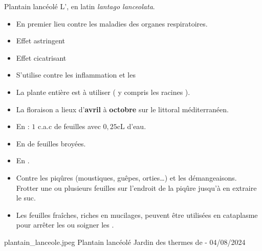 
\ficheidentiteplante
{Plantain lancéolé}
{%
    L', en latin \textit{lantago lanceolata}.
}
{%
    \begin{itemize}[label = \bcplume]
        \item En premier lieu contre les maladies des organes respiratoires.
        \item Effet astringent
        \item Effet cicatrisant
        \item S'utilise contre les inflammation et les 
    \end{itemize}
}
{%
    \begin{itemize}[label = \bcplume]
        \item La plante entière est à utiliser ( y compris les racines ).
        \item La floraison a lieux d'\textbf{avril} à \textbf{octobre} sur le littoral méditerranéen.
    \end{itemize}
}
{%
    \begin{itemize}[label = \bccrayon]
        \item En  : $1$ c.a.c de feuilles avec $0{,}25$cL d'eau.
        \item En  de feuilles broyées.
        \item En .
        \item Contre les piqûres (moustiques, guêpes, orties…) et les démangeaisons.\\
                Frotter une ou plusieurs feuilles sur l’endroit de la piqûre jusqu’à en extraire le suc.
        \item Les feuilles fraîches, riches en mucilages, peuvent être utilisées en cataplasme pour arrêter les  ou soigner les .
    \end{itemize}
}
{%

}
{%
    plantain_lanceole.jpeg
}
{%
    Plantain lancéolé
}
{%
    Jardin des thermes de  - 04/08/2024
}
